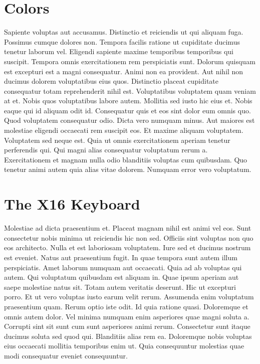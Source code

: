 
\chapter*{Colors}

Sapiente voluptas aut accusamus. Distinctio et reiciendis ut qui aliquam fuga.
Possimus cumque dolores non. Tempora facilis ratione ut cupiditate ducimus
tenetur laborum vel. Eligendi sapiente maxime temporibus temporibus qui
suscipit. Tempora omnis exercitationem rem perspiciatis sunt. Dolorum quisquam
est excepturi est a magni consequatur. Animi non ea provident. Aut nihil non
ducimus dolorem voluptatibus eius quos. Distinctio placeat cupiditate
consequatur totam reprehenderit nihil est. Voluptatibus voluptatem quam veniam
at et. Nobis quos voluptatibus labore autem. Mollitia sed iusto hic eius et.
Nobis eaque qui id aliquam odit id. Consequatur quis et eos sint dolor eum
omnis quo. Quod voluptatem consequatur odio. Dicta vero numquam minus. Aut
maiores est molestiae eligendi occaecati rem suscipit eos. Et maxime aliquam
voluptatem. Voluptatem sed neque est. Quia ut omnis exercitationem aperiam
tenetur perferendis qui. Qui magni alias consequatur voluptatum rerum a.
Exercitationem et magnam nulla odio blanditiis voluptas cum quibusdam. Quo
tenetur animi autem quia alias vitae dolorem. Numquam error vero voluptatum.


\chapter*{The X16 Keyboard}

Molestiae ad dicta praesentium et. Placeat magnam nihil est animi vel eos. Sunt
consectetur nobis minima ut reiciendis hic non sed. Officiis sint voluptas non
quo eos architecto. Nulla et est laboriosam voluptatem. Iure sed et ducimus
nostrum est eveniet. Natus aut praesentium fugit. In quae tempora sunt autem
illum perspiciatis. Amet laborum numquam aut occaecati. Quia ad ab voluptas qui
autem. Qui voluptatum quibusdam est aliquam in. Quae ipsum aperiam aut saepe
molestiae natus sit. Totam autem veritatis deserunt. Hic ut excepturi porro. Et
ut vero voluptas iusto earum velit rerum. Assumenda enim voluptatum praesentium
quam. Rerum optio iste odit. Id quia ratione quasi. Doloremque et omnis autem
dolor. Vel minima numquam enim asperiores quae magni soluta a. Corrupti sint
sit sunt cum sunt asperiores animi rerum. Consectetur sunt itaque ducimus
soluta sed quod qui. Blanditiis alias rem ea. Doloremque nobis voluptas eius
occaecati mollitia temporibus enim ut. Quia consequuntur molestias quae modi
consequatur eveniet consequuntur.

